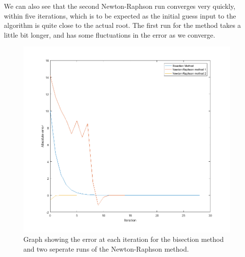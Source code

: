 \documentclass[a4paper,12pt]{UoBnote}
\begin{document}
We can also see that the second Newton-Raphson run converges very quickly, within five iterations, which is to be expected as the initial guess input to the algorithm is quite close to the actual root. The first run for the method takes a little bit longer, and has some fluctuations in the error as we converge. 

\begin{figure}
	\centering
	\includegraphics[scale=1]{errorgraph}
	\caption{Graph showing the error at each iteration for the bisection method and two seperate runs of the Newton-Raphson method.}
	\label{fig:errorgraph}
\end{figure}

\printbibliography
\end{document}
